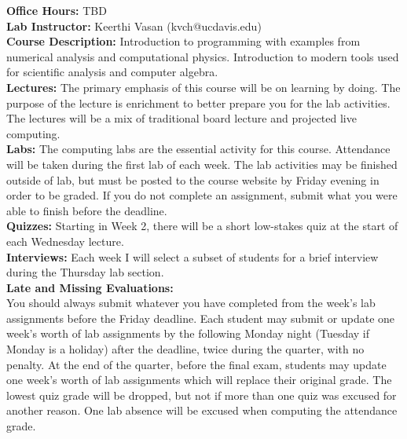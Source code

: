 \documentclass[12pt]{article}
\begin{document}
\noindent
\textbf{Office Hours:} TBD \\

\noindent
\textbf{Lab Instructor:} Keerthi Vasan (kvch@ucdavis.edu) \\

\noindent
\textbf {Course Description:}  
Introduction to programming with examples from numerical analysis and
computational physics. Introduction to modern tools used for
scientific analysis and computer algebra.\\

\noindent \textbf{Lectures:} 
The primary emphasis of this course will be on learning by doing.  The
purpose of the lecture is enrichment to better prepare you for the lab
activities.  The lectures will be a mix of traditional board lecture
and projected live computing.\\

\noindent 
\textbf{Labs:} The computing labs are the essential activity
for this course.  Attendance will be taken during the first lab of
each week.  The lab activities may be finished outside of lab, but
must be posted to the course website by Friday evening in order to be
graded.  If you do not complete an assignment, submit what you were
able to finish before the deadline.\\

\noindent
\textbf{Quizzes:} Starting in Week 2, there will be a short low-stakes
quiz at the start of each Wednesday lecture.  \\

\noindent
\textbf{Interviews:} Each week I will select a subset of students for
a brief interview during the Thursday lab section. \\

\noindent \textbf{Late and Missing Evaluations:}\\ 
You should always submit whatever you have completed from the week's
lab assignments before the Friday deadline.  Each student may submit
or update one week's worth of lab assignments by the following Monday
night (Tuesday if Monday is a holiday) after the deadline, twice
during the quarter, with no penalty.  At the end of the quarter,
before the final exam, students may update one week's worth of lab
assignments which will replace their original grade.  The lowest quiz
grade will be dropped, but not if more than one quiz was excused for
another reason.  One lab absence will be excused when computing the
attendance grade.\\
\end{document}
